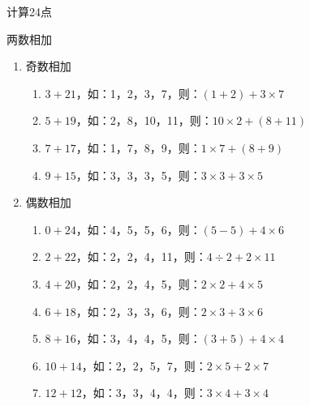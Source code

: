 \documentclass[aspectratio=169]{ctexbeamer} %
\begin{document}
\begin{frame}[t]{计算24点}
\begin{spacing}{1.0}
\normalsize
\alert{两数相加}
\begin{enumerate}[label={\arabic*.}]
\item 奇数相加
	\begin{enumerate}[label={\Alph*.}]
	\item $3 + 21$，如：1，2，3，7，则：$(1 + 2) + 3 \times 7$
	\item $5 + 19$，如：2，8，10，11，则：$10 \times 2 + (8 + 11)$	
	\item $7 + 17$，如：1，7，8，9，则：$1 \times 7 + (8 + 9)$
	\item $9 + 15$，如：3，3，3，5，则：$3 \times 3 + 3 \times 5$
	\end{enumerate}
\item 偶数相加
	\begin{enumerate}[label={\Alph*.}]
	\item $0 + 24$，如：4，5，5，6，则：$(5 - 5) + 4 \times 6$	
	\item $2 + 22$，如：2，2，4，11，则：$4 \div 2 + 2 \times 11$	
	\item $4 + 20$，如：2，2，4，5，则：$2 \times 2 + 4 \times 5$		
	\item $6 + 18$，如：2，3，3，6，则：$2 \times 3 + 3 \times 6$
	\item $8 + 16$，如：3，4，4，5，则：$(3 + 5) + 4 \times 4$
	\item $10 + 14$，如：2，2，5，7，则：$2 \times 5 + 2 \times 7$
	\item $12 + 12$，如：3，3，4，4，则：$3 \times 4 + 3 \times 4$
	\end{enumerate}
\end{enumerate}
\end{spacing}
\end{frame}
\end{document}

